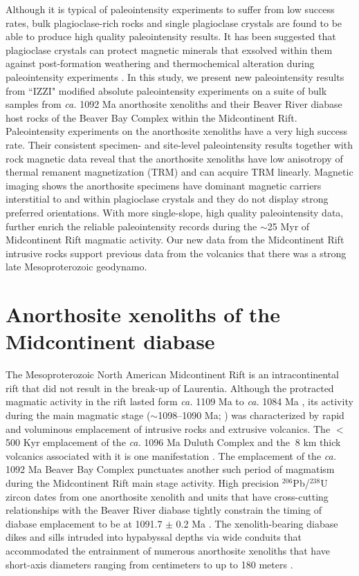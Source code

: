 \documentclass[9pt,twocolumn,twoside,lineno]{pnas-new}
\begin{document}
Although it is typical of paleointensity experiments to suffer from low success rates, bulk plagioclase-rich rocks \cite{Selkin2000a} and single plagioclase crystals \cite{Tarduno2005a} are found to be able to produce high quality paleointensity results. It has been suggested that plagioclase crystals can protect magnetic minerals that exsolved within them against post-formation weathering and thermochemical alteration during paleointensity experiments \cite{Tarduno2005a}. In this study, we present new paleointensity results from ``IZZI" modified absolute paleointensity experiments \cite{Yu2004a} on a suite of bulk samples from \textit{ca.} 1092 Ma anorthosite xenoliths and their Beaver River diabase host rocks of the Beaver Bay Complex within the Midcontinent Rift. Paleointensity experiments on the anorthosite xenoliths have a very high success rate. Their consistent specimen- and site-level paleointensity results together with rock magnetic data reveal that the anorthosite xenoliths have low anisotropy of thermal remanent magnetization (TRM) and can acquire TRM linearly. Magnetic imaging shows the anorthosite specimens have dominant magnetic carriers interstitial to and within plagioclase crystals and they do not display strong preferred orientations. With more single-slope, high quality paleointensity data, further enrich the reliable paleointensity records during the $\sim$25 Myr of Midcontinent Rift magmatic activity. Our new data from the Midcontinent Rift intrusive rocks support previous data from the volcanics that there was a strong late Mesoproterozoic geodynamo.

\section*{Anorthosite xenoliths of the Midcontinent diabase}

The Mesoproterozoic North American Midcontinent Rift is an intracontinental rift that did not result in the break-up of Laurentia. Although the protracted magmatic activity in the rift lasted form \textit{ca.} 1109 Ma to \textit{ca.} 1084 Ma \cite{Swanson-Hysell2019a}, its activity during the main magmatic stage ($\sim$1098–1090 Ma; \cite{Vervoort2007a, Miller2013a}) was characterized by rapid and voluminous emplacement of intrusive rocks and extrusive volcanics. The $<$500 Kyr emplacement of the \textit{ca.} 1096 Ma Duluth Complex and the $~$8 km thick volcanics associated with it is one manifestation \cite{Swanson-Hysell2021a}. The emplacement of the \textit{ca.} 1092 Ma Beaver Bay Complex punctuates another such period of magmatism during the Midcontinent Rift main stage activity. High precision $^{206}$Pb/$^{238}$U zircon dates from one anorthosite xenolith and units that have cross-cutting relationships with the Beaver River diabase tightly constrain the timing of diabase emplacement to be at 1091.7 $\pm$ 0.2 Ma \cite{Zhang2021b}. The xenolith-bearing diabase dikes and sills intruded into hypabyssal depths via wide conduits that accommodated the entrainment of numerous anorthosite xenoliths that have short-axis diameters ranging from centimeters to up to 180 meters \cite{Boerboom2004a, Boerboom2006b}. 
\end{document}
